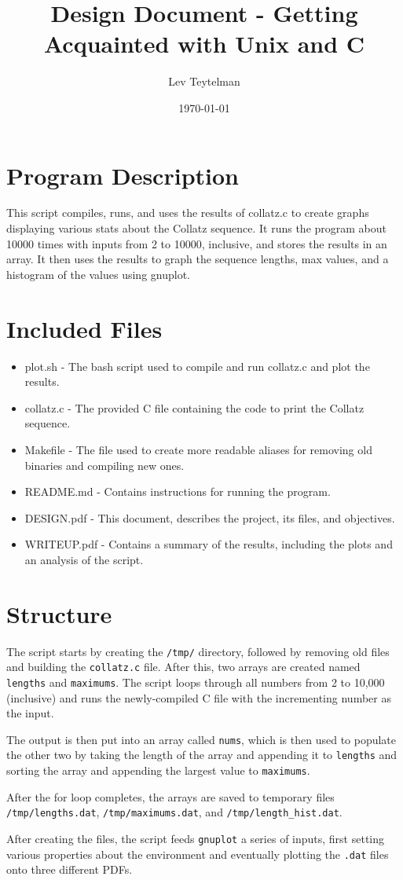 \documentclass[12pt]{article}
\title{Design Document - Getting Acquainted with Unix and C}
\author{Lev Teytelman}
\date{\today}
\begin{document}
\maketitle
\section{Program Description}

This script compiles, runs, and uses the results of collatz.c to create graphs displaying various stats about the Collatz sequence. It runs the program about 10000 times with inputs from 2 to 10000, inclusive, and stores the results in an array. It then uses the results to graph the sequence lengths, max values, and a histogram of the values using gnuplot.
\section{Included Files}

\begin{itemize}
    \item plot.sh - The bash script used to compile and run collatz.c and plot the results.
    \item collatz.c - The provided C file containing the code to print the Collatz sequence.
    \item Makefile - The file used to create more readable aliases for removing old binaries and compiling new ones.
    \item README.md - Contains instructions for running the program.
    \item DESIGN.pdf - This document, describes the project, its files, and objectives.
    \item WRITEUP.pdf - Contains a summary of the results, including the plots and an analysis of the script.
\end{itemize}
\section{Structure}

The script starts by creating the \verb|/tmp/| directory, followed by removing old files and building the \verb|collatz.c| file. After this, two arrays are created named \verb|lengths| and \verb|maximums|. The script loops through all numbers from 2 to 10,000 (inclusive) and runs the newly-compiled C file with the incrementing number as the input.

The output is then put into an array called \verb|nums|, which is then used to populate the other two by taking the length of the array and appending it to \verb|lengths| and sorting the array and appending the largest value to \verb|maximums|.

After the for loop completes, the arrays are saved to temporary files \verb|/tmp/lengths.dat|, \verb|/tmp/maximums.dat|, and \verb|/tmp/length_hist.dat|.

After creating the files, the script feeds \verb|gnuplot| a series of inputs, first setting various properties about the environment and eventually plotting the \verb|.dat| files onto three different PDFs.
\end{document}
